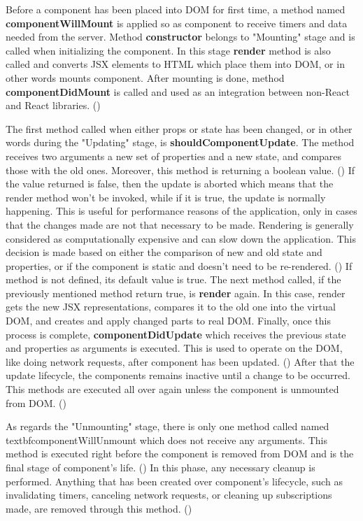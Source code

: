 Before a component has been placed into DOM for first time, a method named \textbf{componentWillMount} is applied so as component to receive timers and data needed from the server. Method \textbf{constructor}  belongs to "Mounting" stage and is called when initializing the component. In this stage \textbf{render} method is also called and converts JSX elements to HTML which place them into DOM, or in other words mounts component. After mounting is done, method \textbf{componentDidMount} is called and used as an integration between non-React and React libraries. (\cite{Reference13}) \par

The first method called when either props or state has been changed, or in other words during the "Updating" stage, is \textbf{shouldComponentUpdate}. The method receives two arguments a new set of properties and a new state, and compares those with the old ones. Moreover, this method is returning a boolean value. (\cite{Reference13}) If the value returned is false, then the update is aborted which means that the render method won't be invoked, while if it is true, the update is normally happening. This is useful for performance reasons of the application, only in cases that the changes made are not that necessary to be made. Rendering is generally considered as computationally expensive and can slow down the application. This decision is made based on either the comparison of new and old state and properties, or if the component is static and doesn't need to be re-rendered. (\cite{Reference14}) If method is not defined, its default value is true. The next method called, if the previously mentioned method return true, is \textbf{render} again. In this case, render gets the new JSX representations, compares it to the old one into the virtual DOM, and creates and apply changed parts to real DOM. Finally, once this process is complete, \textbf{componentDidUpdate} which receives the previous state and properties as arguments is executed. This is used to operate on the DOM, like doing network requests, after component has been updated. (\cite{Reference16}) After that the update lifecycle, the components remains inactive until a change to be occurred. This methods are executed all over again unless the component is unmounted from DOM. (\cite{Reference13}) \par 

As regards the "Unmounting" stage, there is only one method called named textbf{componentWillUnmount} which does not receive any arguments. This method is executed right before the component is removed from DOM and is the final stage of component's life. (\cite{Reference14}) In this phase, any necessary cleanup is performed. Anything that has been created over component's lifecycle, such as invalidating timers, canceling network requests, or cleaning up subscriptions made, are removed through this method. (\cite{Reference16}) \par 

